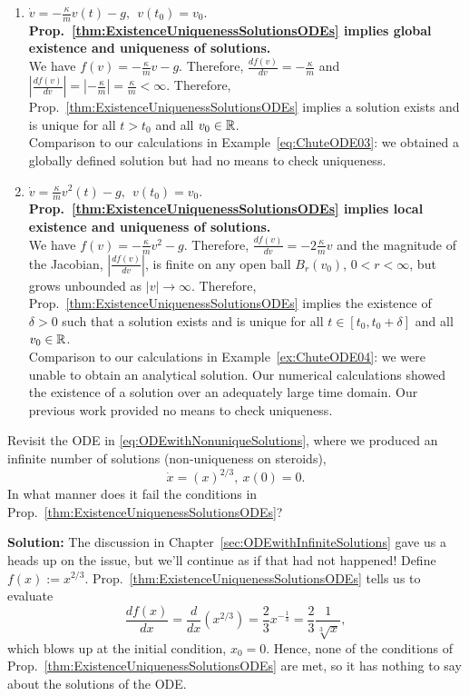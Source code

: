 \begin{enumerate}
\item $\dot{v} = - \frac{\kappa}{m} v(t)- g, ~~v(t_0) = v_0$. \Ans~ \textbf{Prop.~\ref{thm:ExistenceUniquenessSolutionsODEs} implies global existence and uniqueness of solutions.} \\

We have $f(v) =  - \frac{\kappa}{m} v - g$. Therefore, $\frac{df(v)}{dv} = - \frac{\kappa}{m} $ and $|\frac{df(v)}{dv}| =|- \frac{\kappa}{m} | = \frac{\kappa}{m} < \infty$. Therefore, 
Prop.~\ref{thm:ExistenceUniquenessSolutionsODEs} implies a solution exists and is unique for all $t>t_0$ and all $v_0 \in \mathbb R$.\\

Comparison to our calculations in Example~\ref{eq:ChuteODE03}: we obtained a globally defined solution but had no means to check uniqueness. 

\item $\dot{v} = \frac{\kappa}{m} v^2(t)-g, ~~v(t_0) = v_0$.  \Ans~ \textbf{Prop.~\ref{thm:ExistenceUniquenessSolutionsODEs} implies local existence and uniqueness of solutions.} \\

We have $f(v) =  - \frac{\kappa}{m} v^2 -g$. Therefore, $\frac{df(v)}{dv} = - 2 \frac{\kappa}{m} v$ and the magnitude of the Jacobian, $|\frac{df(v)}{dv}|$, is finite on any open ball $B_r(v_0)$, $0 < r < \infty$, but grows unbounded as $|v| \to \infty$. Therefore, Prop.~\ref{thm:ExistenceUniquenessSolutionsODEs} implies the existence of $\delta>0$ such that a solution exists and is unique for all $t \in[t_0, t_0+\delta]$ and all $v_0 \in \mathbb R$.\\

Comparison to our calculations in Example~\ref{ex:ChuteODE04}: we were unable to obtain an analytical solution. Our numerical calculations showed the existence of a solution over an adequately large time domain. Our previous work provided no means to check uniqueness. \\
\end{enumerate} 
\Qed

\bigskip

\begin{exercise} Revisit the ODE in \eqref{eq:ODEwithNonuniqueSolutions}, where we produced an infinite number of solutions (non-uniqueness on steroids),
$$
    \dot{x} = \left(x\right)^{2/3}, ~x(0)=0.
$$
In what manner does it fail the conditions in Prop.~\ref{thm:ExistenceUniquenessSolutionsODEs}?    
\end{exercise}
\textbf{Solution:}
The discussion in Chapter~\ref{sec:ODEwithInfiniteSolutions} gave us a heads up on the issue, but we'll continue as if that had not happened! Define $f(x):=x^{2/3}$. 
Prop.~\ref{thm:ExistenceUniquenessSolutionsODEs} tells us to evaluate 
$$ \frac{df(x)}{dx} =  \frac{d}{dx} \left( x^{2/3} \right) = \frac{2}{3}x^{ -\frac{1}{3}} = \frac{2}{3} \frac{1}{ \sqrt[3]{x}},$$
which blows up at the initial condition, $x_0 = 0$. Hence, none of the conditions of Prop.~\ref{thm:ExistenceUniquenessSolutionsODEs} are met, so it has nothing to say about the solutions of the ODE.

